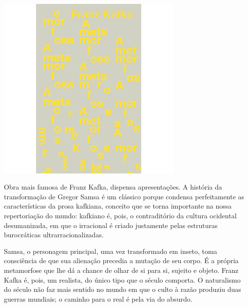 \hspace{.5cm}

\begin{center}
\hspace*{-2.5cm}
\hspace*{2.5cm}\includegraphics[width=92mm]{./grid/kafka.png}
\end{center}

\hspace*{-7cm}\hrulefill\hspace*{-7cm}

\medskip

\noindent{}Obra mais famosa de Franz Kafka, {} dispensa apresentações. A história da transformação de Gregor Samsa é um clássico porque condensa perfeitamente as características da prosa kafkiana, conceito que se torna importante na nossa repertoriação do mundo: kafkiano é, pois, o contraditório da cultura ocidental desumanizada, em que o irracional é criado justamente pelas estruturas burocráticas ultrarracionalizadas.

Samsa, o personagem principal, uma vez transformado em inseto, toma consciência de que sua alienação precedia a mutação de seu corpo. É a própria metamorfose que lhe dá a chance de olhar de si para si, sujeito e objeto. Franz Kafka é, pois, um realista, do único tipo que o século  comporta. O naturalismo do século  não faz mais sentido no mundo em que o culto à razão produziu duas guerras mundiais; o caminho para o real é pela via do absurdo.

\vfill
\enlargethispage{\baselineskip}

